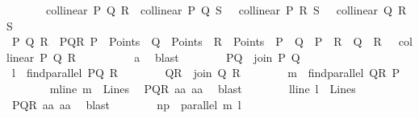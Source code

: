 \begin{isabellebody}
\ \ \ \ \ \ {\isasymnot}\ collinear\ P\ Q\ R\ {\isasymand}{\isasymnot}\ collinear\ P\ Q\ S\ {\isasymand}\ {\isasymnot}\ collinear\ P\ R\ S\ {\isasymand}\ {\isasymnot}\ collinear\ Q\ R\ S{\isachardoublequoteclose}\isanewline
%
\isadelimproof
\ \ \ \ %
\endisadelimproof
%
\isatagproof
{}\isamarkupfalse%
\ {\isacharminus}{\kern0pt}\isanewline
\ \ \ \ \ \ \isamarkupfalse%
\ P\ Q\ R\ \ PQR{\isacharcolon}{\kern0pt}\ {\isachardoublequoteopen}P\ {\isasymin}\ Points\ {\isasymand}\ Q\ {\isasymin}\ Points\ {\isasymand}\ R\ {\isasymin}\ Points\ {\isasymand}\ P\ {\isasymnoteq}\ Q\ {\isasymand}\ P\ {\isasymnoteq}\ R\ {\isasymand}\ Q\ {\isasymnoteq}\ R\ {\isasymand}\ {\isasymnot}\ collinear\ P\ Q\ R{\isachardoublequoteclose}\isanewline
\ \ \ \ \ \ \ \ \isamarkupfalse%
\ a{}\ \isamarkupfalse%
\ blast\isanewline
\ \ \ \ \ \ \isamarkupfalse%
\ {\isacharquery}{\kern0pt}PQ\ {\isacharequal}{\kern0pt}{\isachardoublequoteopen}\ join\ P\ Q{\isachardoublequoteclose}\isanewline
\ \ \ \ \ \ \isamarkupfalse%
\ {\isacharquery}{\kern0pt}l\ {\isacharequal}{\kern0pt}\ {\isachardoublequoteopen}find{\isacharunderscore}{\kern0pt}parallel\ {\isacharquery}{\kern0pt}PQ\ R{\isachardoublequoteclose}\isanewline
\ \ \ \ \ \ \isamarkupfalse%
\ {\isacharquery}{\kern0pt}QR\ {\isacharequal}{\kern0pt}\ {\isachardoublequoteopen}join\ Q\ R{\isachardoublequoteclose}\isanewline
\ \ \ \ \ \ \isamarkupfalse%
\ {\isacharquery}{\kern0pt}m\ {\isacharequal}{\kern0pt}\ {\isachardoublequoteopen}find{\isacharunderscore}{\kern0pt}parallel\ {\isacharquery}{\kern0pt}QR\ P{\isachardoublequoteclose}\ \isanewline
\ \ \ \ \ \ \isamarkupfalse%
\ mline{\isacharcolon}{\kern0pt}\ {\isachardoublequoteopen}{\isacharquery}{\kern0pt}m\ {\isasymin}\ Lines{\isachardoublequoteclose}\ \isamarkupfalse%
\ PQR\ a{}a\ a{}a\ \isamarkupfalse%
\ blast\isanewline
\ \ \ \ \ \ \isamarkupfalse%
\ lline{\isacharcolon}{\kern0pt}\ {\isachardoublequoteopen}{\isacharquery}{\kern0pt}l\ {\isasymin}\ Lines{\isachardoublequoteclose}\ \isamarkupfalse%
\ PQR\ a{}a\ a{}a\ \isamarkupfalse%
\ blast\isanewline
\ \ \ \ \ \ \isamarkupfalse%
\ np{\isacharcolon}{\kern0pt}\ {\isachardoublequoteopen}{\isasymnot}\ parallel\ {\isacharquery}{\kern0pt}m\ {\isacharquery}{\kern0pt}l{\isachardoublequoteclose}\ \isanewline

\end{isabellebody}
